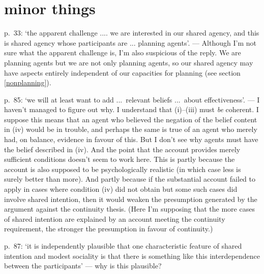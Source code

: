 \documentclass[12pt,letterpaper]{extarticle}
\begin{document}
\section{minor things}

p.\ 33: `the apparent challenge .... we are interested in our shared agency, and this is shared agency whose participants are ... planning agents'. --- Although I'm not sure what the apparent challenge is, I'm also suspicious of the reply.  We are planning agents but we are not only planning agents, so our shared agency may have aspects entirely independent of our capacities for planning (see section \vref{nonplanning}).

p.\ 85: `we will at least want to add ...\ relevant beliefs  ...\ about effectiveness'. --- I haven't managed to figure out why.  I understand that (i)--(iii) must \emph{be} coherent.
I suppose this means that an agent who believed the negation of the belief content in (iv) would be in trouble, and perhaps the same is true of an agent who merely had, on balance, evidence in favour of this.
But I don't see why agents must have the belief described in (iv).
And the point that the account provides merely sufficient conditions doesn't seem to work here.
This is partly because the account is also supposed to be psychologically realistic (in which case less is surely better than more).
And partly because if the substantial account failed to  apply in cases where condition (iv) did not obtain but some such cases did involve shared intention, then it would weaken the presumption generated by the argument against the continuity thesis.
(Here I'm supposing that the more cases of shared intention are explained by an account meeting the continuity requirement, the stronger the presumption in favour of continuity.)

p.\ 87: `it is independently plausible that one characteristic feature of shared intention and modest sociality is that there is something like this interdependence between the participants' --- why is this plausible?  





\small

\end{document}
